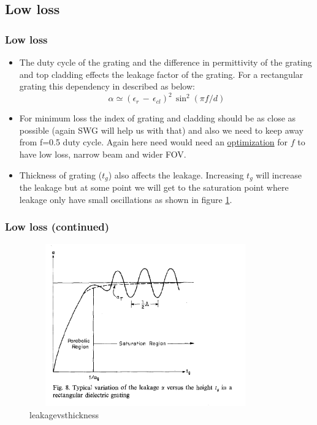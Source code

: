 \documentclass{beamer}
\begin{document}
\subsection{Low loss}
\begin{frame}
\frametitle{Low loss}
\begin{itemize}
\item  The duty cycle of the grating and the difference in permittivity of the grating and top cladding effects the leakage factor of the grating. For a rectangular grating this dependency in described as below:
    \begin{equation}
    \alpha \simeq (\epsilon_r \,- \, \epsilon_{cl})^2 \, \sin^2(\pi f /d)
    \end{equation}
\item For minimum loss the index of grating and cladding should be as close as possible (again SWG will help us with that) and also we need to keep away from f=0.5 duty cycle. Again here need would need an \underline{optimization} for $f$ to have low loss, narrow beam and wider FOV.
\item Thickness of grating ($t_g$) also affects the leakage. Increasing $t_g$ will increase the leakage but at some point we will get to the saturation point where leakage only have small oscillations as shown in figure \ref{loss1}.
\end{itemize}
\end{frame}
%
\begin{frame}
\frametitle{Low loss (continued)}
\begin{figure}[H]
\begin{center}
\includegraphics[width=10cm, height=7cm]{Figures/leakagevsthickness}
\caption{leakagevsthickness}
\label{loss1}
\end{center}
\end{figure}
\end{frame}
\end{document}
